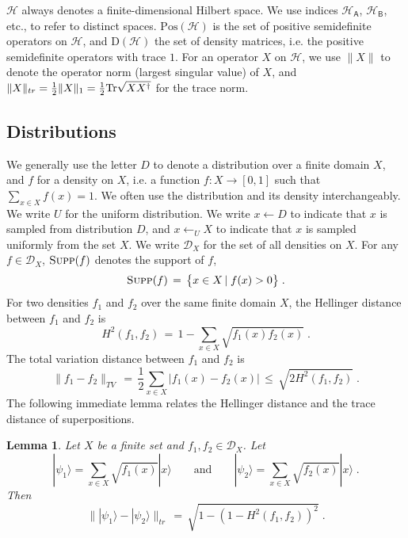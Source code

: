 \documentclass[11pt]{article}
\newtheorem{lemma}[theorem]{Lemma}
\theoremstyle{remark}
\theoremstyle{definition}
\newcommand{\ket}[1]{|#1\rangle}
\newcommand{\Tr}{\mbox{\rm Tr}}
\newcommand{\reg}[1]{{\textsf{#1}}}
\newcommand{\mH}{\mathcal{H}}
\newcommand{\setft}[1]{\mathrm{#1}}
\newcommand{\Density}{\setft{D}}
\newcommand{\Pos}{\setft{Pos}}
\newcommand{\supp}{\textsc{Supp}}
\begin{document}
 $\mH$ always denotes a finite-dimensional Hilbert space. We use indices $\mH_\reg{A}$, $\mH_\reg{B}$, etc., to refer to distinct spaces. $\Pos(\mH)$ is the set of positive semidefinite operators on $\mH$, and $\Density(\mH)$ the set of density matrices, i.e. the positive semidefinite operators with trace $1$. For an operator $X$ on $\mH$, we use $\|X\|$ to denote the operator norm (largest singular value) of $X$, and $\|X\|_{tr} = \frac{1}{2}\|X\|_1 = \frac{1}{2}\Tr\sqrt{XX^\dagger}$ for the trace norm. 

\subsection{Distributions}

We generally use the letter $D$ to denote a distribution over a finite domain $X$, and $f$ for a density on $X$, i.e. a function $f:X\to[0,1]$ such that $\sum_{x\in X} f(x)=1$. We often use the distribution and its density interchangeably. We write $U$ for the uniform distribution. We write $x\leftarrow D$ to indicate that $x$ is sampled from distribution $D$, and $x\leftarrow_U X$ to indicate that $x$ is sampled uniformly from the set $X$. 
We write $\mathcal{D}_X$ for the set of all densities on $X$.
For any $f\in\mathcal{D}_X$, $\supp(f)$ denotes the support of $f$,
\begin{equation*}
    \supp(f) \,=\, \big\{x\in X \,|\; f(x)> 0\big\}\;.
\end{equation*}
For two densities $f_1$ and $f_2$ over the same finite domain $X$, the Hellinger distance  between $f_1$ and $f_2$ is
\begin{equation}\label{eq:bhatt}
H^2(f_1,f_2) \,=\, 1- \sum_{x\in X}\sqrt{f_1(x)f_2(x)}\;.
\end{equation}
The total variation distance between $f_1$ and $f_2$ is
\begin{equation}\label{eq:stattobhatt}
\|f_1-f_2\|_{TV} \,=\, \frac{1}{2} \sum_{x\in X}|f_1(x) - f_2(x)| \,\leq\, \sqrt{2H^2(f_1,f_2)}\;.
\end{equation}
The following immediate lemma relates the Hellinger distance and the trace distance of superpositions. 
\begin{lemma}
Let $X$ be a finite set and $f_1,f_2\in\mathcal{D}_X$. Let 
$$ \ket{\psi_1}=\sum_{x\in X}\sqrt{f_1(x)}\ket{x}\qquad\text{and}\qquad  \ket{\psi_2}=\sum_{x\in X}\sqrt{f_2(x)}\ket{x}\;.$$
 Then 
 $$\|\ket{\psi_1}-\ket{\psi_2}\|_{tr}\,=\, \sqrt{ 1 - (1-H^2(f_1,f_2))^2}\;.$$
\end{lemma}
\end{document}
